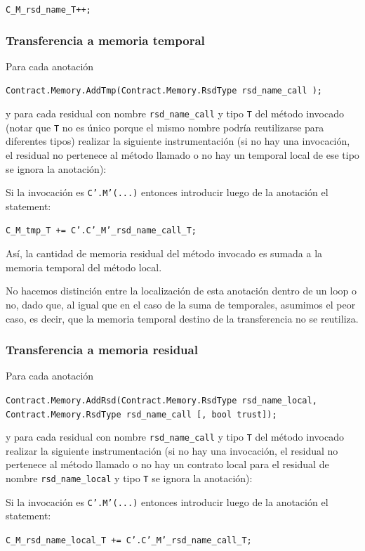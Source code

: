 \documentclass[12pt,a4paper]{article}
\newcommand\mono[1]{\texttt{#1}}
\begin{document}
				\mono{C\_M\_rsd\_name\_T++;}
			\subsubsection{Transferencia a memoria temporal}
				Para cada anotación

				\mono{Contract.Memory.AddTmp(Contract.Memory.RsdType rsd\_name\_call \newline [, bool trust]);}

				y para cada residual con nombre \mono{rsd\_name\_call} y tipo \mono{T} del método invocado (notar que \mono{T} no es único porque el mismo nombre podría reutilizarse para diferentes tipos) realizar la siguiente instrumentación (si no hay una invocación, el residual no pertenece al método llamado o no hay un temporal local de ese tipo se ignora la anotación):

				Si la invocación es \mono{C'.M'(...)} entonces introducir luego de la anotación el statement:

				\mono{C\_M\_tmp\_T += C'.C'\_M'\_rsd\_name\_call\_T;}

				Así, la cantidad de memoria residual del método invocado es sumada a la memoria temporal del método local.

				No hacemos distinción entre la localización de esta anotación dentro de un loop o no, dado que, al igual que en el caso de la suma de temporales, asumimos el peor caso, es decir, que la memoria temporal destino de la transferencia no se reutiliza.
			\subsubsection{Transferencia a memoria residual}
				Para cada anotación

				\mono{Contract.Memory.AddRsd(Contract.Memory.RsdType rsd\_name\_local, \\Contract.Memory.RsdType rsd\_name\_call [, bool trust]);}

				y para cada residual con nombre \mono{rsd\_name\_call} y tipo \mono{T} del método invocado realizar la siguiente instrumentación (si no hay una invocación, el residual no pertenece al método llamado o no hay un contrato local para el residual de nombre \mono{rsd\_name\_local} y tipo \mono{T} se ignora la anotación):

				Si la invocación es \mono{C'.M'(...)} entonces introducir luego de la anotación el statement:

				\mono{C\_M\_rsd\_name\_local\_T += C'.C'\_M'\_rsd\_name\_call\_T;}
\end{document}
